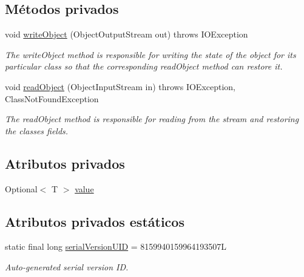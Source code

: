 \subsection*{Métodos privados}
\begin{DoxyCompactItemize}
\item 
void \mbox{\hyperlink{classcom_1_1ruralhousejsf_1_1domain_1_1observer_1_1_observed_value_aeb8db23c0310aa0fd0d9bcb2da10fa74}{write\+Object}} (Object\+Output\+Stream out)  throws I\+O\+Exception 
\begin{DoxyCompactList}\small\item\em The write\+Object method is responsible for writing the state of the object for its particular class so that the corresponding read\+Object method can restore it. \end{DoxyCompactList}\item 
void \mbox{\hyperlink{classcom_1_1ruralhousejsf_1_1domain_1_1observer_1_1_observed_value_a51ae17b2577c4ffc87ccf4abca82ab3d}{read\+Object}} (Object\+Input\+Stream in)  throws I\+O\+Exception, Class\+Not\+Found\+Exception 
\begin{DoxyCompactList}\small\item\em The read\+Object method is responsible for reading from the stream and restoring the classes fields. \end{DoxyCompactList}\end{DoxyCompactItemize}
\subsection*{Atributos privados}
\begin{DoxyCompactItemize}
\item 
Optional$<$ T $>$ \mbox{\hyperlink{classcom_1_1ruralhousejsf_1_1domain_1_1observer_1_1_observed_value_a7f337dfd21158b7642243b5fd1fcb877}{value}}
\end{DoxyCompactItemize}
\subsection*{Atributos privados estáticos}
\begin{DoxyCompactItemize}
\item 
static final long \mbox{\hyperlink{classcom_1_1ruralhousejsf_1_1domain_1_1observer_1_1_observed_value_a01052aac89cda6c5f230343d40b54e89}{serial\+Version\+U\+ID}} = 8159940159964193507L
\begin{DoxyCompactList}\small\item\em Auto-\/generated serial version ID. \end{DoxyCompactList}\end{DoxyCompactItemize}
